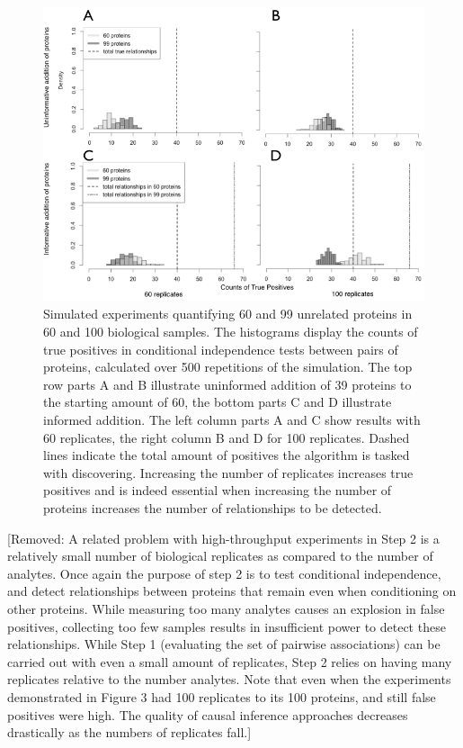 \documentclass[journal=jacsat,manuscript=article]{achemso}
\def\removed#1{{\color{magenta}[Removed: #1]}}
\begin{document}
\begin{figure}[!tpb]
\centerline{\includegraphics[width=.8\textwidth]{figs/true_pos.png}}
\caption{Simulated experiments quantifying 60 and 99 unrelated proteins in 60 and 100 biological samples. The histograms display the counts of true positives in conditional independence tests between pairs of proteins, calculated over 500 repetitions of the simulation. The top row parts A and B illustrate uninformed addition of 39 proteins to the starting amount of 60, the bottom parts C and D illustrate informed addition.  The left column parts A and C show results with 60 replicates, the right column B and D for 100 replicates.  Dashed lines indicate the total amount of positives the algorithm is tasked with discovering.  Increasing the number of replicates increases true positives and is indeed essential when increasing the number of proteins increases the number of relationships to be detected.}
\label{spur_dep}
\end{figure}

\removed{A related problem with high-throughput experiments in Step 2 is a relatively small number of biological replicates as compared to the number of analytes.  Once again the purpose of step 2 is to test conditional independence, and detect relationships between proteins that remain even when conditioning on other proteins.  While measuring too many analytes causes an explosion in false positives, collecting too few samples results in insufficient power to detect these relationships. While Step 1 (evaluating the set of pairwise associations) can be carried out with even a small amount of replicates, Step 2 relies on having many replicates relative to the number analytes.  Note that even when the experiments demonstrated in Figure 3 had 100 replicates to its 100 proteins, and still false positives were high. The quality of causal inference approaches decreases drastically as the numbers of replicates fall.}
\end{document}
